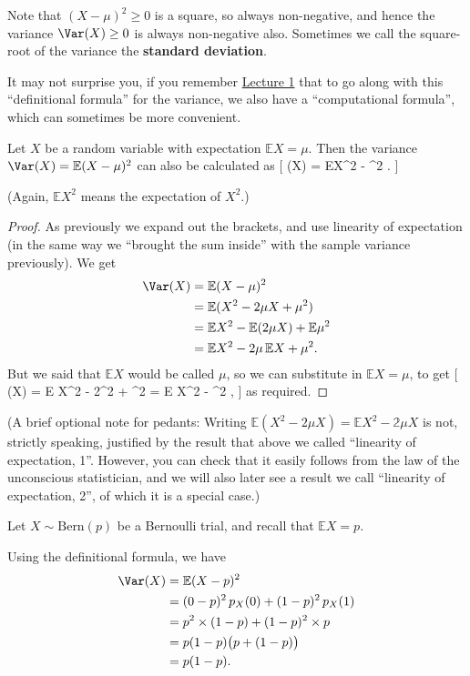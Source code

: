 \documentclass[
  letterpaper,
]{report}
\theoremstyle{definition}
\theoremstyle{definition}
\theoremstyle{remark}
\begin{document}
Note that \((X - \mu)^2 \geq 0\) is a square, so always non-negative,
and hence the variance \(\Var(X) \geq 0\) is always non-negative also.
Sometimes we call the square-root of the variance the \textbf{standard
deviation}.

It may not surprise you, if you remember
\protect\hyperlink{L01-stats}{Lecture 1} that to go along with this
``definitional formula'' for the variance, we also have a
``computational formula'', which can sometimes be more convenient.

Let \(X\) be a random variable with expectation \(\mathbb EX = \mu\).
Then the variance \(\Var(X) = \mathbb E(X - \mu)^2\) can also be
calculated as {[} \Var(X) = \mathbb EX\^{}2 - \mu\^{}2 . {]}

(Again, \(\mathbb EX^2\) means the expectation of \(X^2\).)

\begin{proof}

As previously we expand out the brackets, and use linearity of
expectation (in the same way we ``brought the sum inside'' with the
sample variance previously). We get \begin{align*}
  \Var(X) &= \mathbb E(X - \mu)^2 \\
    &= \mathbb E(X^2 - 2\mu X + \mu^2) \\
    &= \mathbb EX^2 - \mathbb E(2\mu X) + \mathbb E \mu^2 \\
    &= \mathbb EX^2 - 2\mu \,\mathbb EX + \mu^2 .
\end{align*} But we said that \(\mathbb EX\) would be called \(\mu\), so
we can substitute in \(\mathbb EX = \mu\), to get {[} \Var(X) =
\mathbb E X\^{}2 - 2\mu\^{}2 + \mu\^{}2 = \mathbb E X\^{}2 - \mu\^{}2 ,
{]} as required.

\end{proof}

(A brief optional note for pedants: Writing
\(\mathbb E(X^2 - 2\mu X) = \mathbb EX^2 - \mathbb 2\mu X\) is not,
strictly speaking, justified by the result that above we called
``linearity of expectation, 1''. However, you can check that it easily
follows from the law of the unconscious statistician, and we will also
later see a result we call ``linearity of expectation, 2'', of which it
is a special case.)

Let \(X \sim \text{Bern}(p)\) be a Bernoulli trial, and recall that
\(\mathbb EX = p\).

Using the definitional formula, we have \begin{align*}
\Var(X) &= \mathbb E(X-p)^2 \\
        &= (0 - p)^2 \,p_X(0) + (1-p)^2\, p_X(1) \\
        &= p^2\times(1-p) + (1-p)^2 \times p \\
        &= p(1-p)\big(p + (1-p)\big) \\
        &= p(1-p) .
\end{align*}
\end{document}
